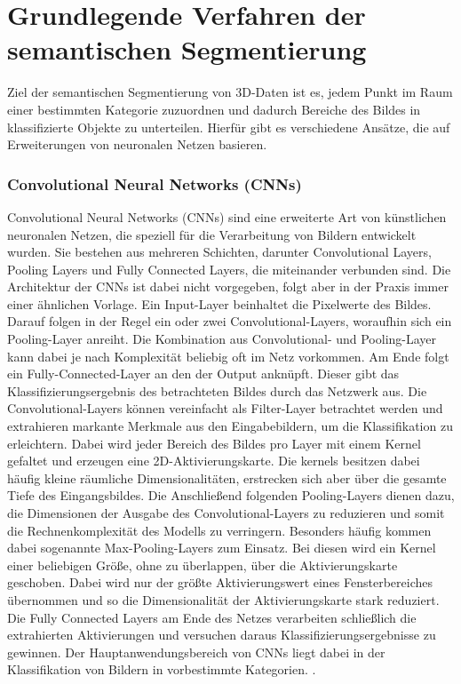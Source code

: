 \chapter{Grundlegende Verfahren der semantischen Segmentierung}

Ziel der semantischen Segmentierung von 3D-Daten ist es, jedem Punkt im Raum
einer bestimmten Kategorie zuzuordnen und dadurch Bereiche des Bildes in
klassifizierte Objekte zu unterteilen. Hierfür gibt es verschiedene Ansätze,
die auf Erweiterungen von neuronalen Netzen basieren.

\subsection{Convolutional Neural Networks (CNNs)}
Convolutional Neural Networks (CNNs) sind eine erweiterte Art von künstlichen
neuronalen Netzen, die speziell für die Verarbeitung von Bildern entwickelt
wurden. Sie bestehen aus mehreren Schichten, darunter Convolutional Layers,
Pooling Layers und Fully Connected Layers, die miteinander verbunden sind. Die
Architektur der CNNs ist dabei nicht vorgegeben, folgt aber in der Praxis immer
einer ähnlichen Vorlage. Ein Input-Layer beinhaltet die Pixelwerte des Bildes.
Darauf folgen in der Regel ein oder zwei Convolutional-Layers, woraufhin sich
ein Pooling-Layer anreiht. Die Kombination aus Convolutional- und Pooling-Layer
kann dabei je nach Komplexität beliebig oft im Netz vorkommen. Am Ende folgt
ein Fully-Connected-Layer an den der Output anknüpft. Dieser gibt das
Klassifizierungsergebnis des betrachteten Bildes durch das Netzwerk aus. Die
Convolutional-Layers können vereinfacht als Filter-Layer betrachtet werden und
extrahieren markante Merkmale aus den Eingabebildern, um die Klassifikation zu
erleichtern. Dabei wird jeder Bereich des Bildes pro Layer mit einem Kernel
gefaltet und erzeugen eine 2D-Aktivierungskarte. Die kernels besitzen dabei
häufig kleine räumliche Dimensionalitäten, erstrecken sich aber über die
gesamte Tiefe des Eingangsbildes. Die Anschließend folgenden Pooling-Layers
dienen dazu, die Dimensionen der Ausgabe des Convolutional-Layers zu reduzieren
und somit die Rechnenkomplexität des Modells zu verringern. Besonders häufig
kommen dabei sogenannte Max-Pooling-Layers zum Einsatz. Bei diesen wird ein
Kernel einer beliebigen Größe, ohne zu überlappen, über die Aktivierungskarte
geschoben. Dabei wird nur der größte Aktivierungswert eines Fensterbereiches
übernommen und so die Dimensionalität der Aktivierungskarte stark reduziert.
Die Fully Connected Layers am Ende des Netzes verarbeiten schließlich die
extrahierten Aktivierungen und versuchen daraus Klassifizierungsergebnisse zu
gewinnen. Der Hauptanwendungsbereich von CNNs liegt dabei in der Klassifikation
von Bildern in vorbestimmte Kategorien. \cite{11262015}.

